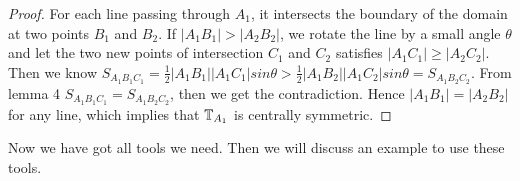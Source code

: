 \begin{proof}
	For each line passing through $A_1$, it intersects the boundary 
	of the domain at two points $B_1$ and $B_2$. If $|A_1B_1| > |A_2B_2|$, 
	we rotate the line by a small angle $\theta$ and let the two new 
	points of intersection $C_1$ and $C_2$ satisfies $|A_1C_1| \geq |A_2C_2|$. 
	Then we know  $S_{A_1B_1C_1} = \frac{1}{2}|A_1B_1||A_1C_1|sin\theta >  \frac{1}{2}|A_1B_2||A_1C_2|sin\theta = S_{A_1B_2C_2}$. 
	From lemma 4
	$S_{A_1B_1C_1}=S_{A_1B_2C_2}$, then we get the 
	contradiction. Hence $|A_1B_1|=|A_2B_2|$ for any line, 
	which implies that $\mathbb{T}_{A_1}$ is centrally symmetric.
\end{proof}

Now we have got all tools we need. Then we will discuss an example
to use these tools.
